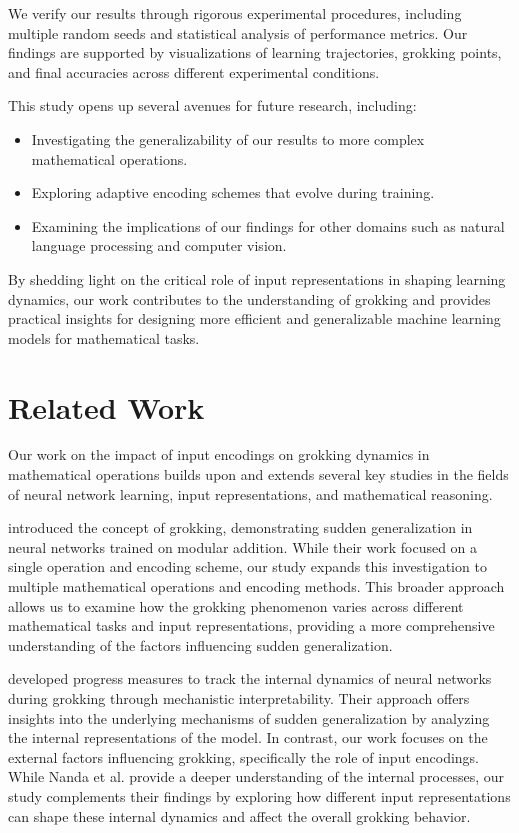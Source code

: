\documentclass{article} %
\begin{document}
We verify our results through rigorous experimental procedures, including multiple random seeds and statistical analysis of performance metrics. Our findings are supported by visualizations of learning trajectories, grokking points, and final accuracies across different experimental conditions.

This study opens up several avenues for future research, including:
\begin{itemize}
    \item Investigating the generalizability of our results to more complex mathematical operations.
    \item Exploring adaptive encoding schemes that evolve during training.
    \item Examining the implications of our findings for other domains such as natural language processing and computer vision.
\end{itemize}

By shedding light on the critical role of input representations in shaping learning dynamics, our work contributes to the understanding of grokking and provides practical insights for designing more efficient and generalizable machine learning models for mathematical tasks.

\section{Related Work}
\label{sec:related}

Our work on the impact of input encodings on grokking dynamics in mathematical operations builds upon and extends several key studies in the fields of neural network learning, input representations, and mathematical reasoning.

\citet{Power2022GrokkingGO} introduced the concept of grokking, demonstrating sudden generalization in neural networks trained on modular addition. While their work focused on a single operation and encoding scheme, our study expands this investigation to multiple mathematical operations and encoding methods. This broader approach allows us to examine how the grokking phenomenon varies across different mathematical tasks and input representations, providing a more comprehensive understanding of the factors influencing sudden generalization.

\citet{Nanda2023ProgressMF} developed progress measures to track the internal dynamics of neural networks during grokking through mechanistic interpretability. Their approach offers insights into the underlying mechanisms of sudden generalization by analyzing the internal representations of the model. In contrast, our work focuses on the external factors influencing grokking, specifically the role of input encodings. While Nanda et al. provide a deeper understanding of the internal processes, our study complements their findings by exploring how different input representations can shape these internal dynamics and affect the overall grokking behavior.
\end{document}

